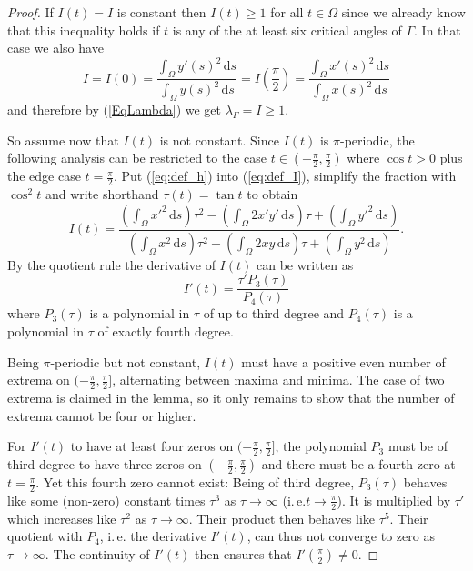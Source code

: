 \documentclass[10pt,a4paper]{amsart}
\newcommand{\ds}{\,\mathrm{d}s}
\newcommand{\ite}{i.\,e.\xspace}
\begin{document}
\begin{proof}
    If $I(t) = I$ is constant then $I(t) \ge 1$ for all $t\in\Omega$ since we already know that this inequality holds if $t$ is any of the at least six critical angles of $\Gamma$. In that case we also have
    \[I = I(0) = \frac{\int_\Omega y'(s)^2\ds}{\int_\Omega y(s)^2\ds} = I(\frac{\pi}{2}) = \frac{\int_\Omega x'(s)^2\ds}{\int_\Omega x(s)^2\ds}\]
    and therefore by (\ref{EqLambda}) we get  $\lambda_\Gamma = I \ge 1$.
    
    So assume now that $I(t)$ is not constant. Since $I(t)$ is $\pi$-periodic, the following analysis can be restricted to the case $t \in (-\frac\pi2,\frac\pi2)$ where $\cos t>0$ plus the edge case $t = \frac\pi2$.
    Put (\ref{eq:def_h}) into (\ref{eq:def_I}), simplify the fraction with $\cos^2 t$ and write shorthand $\tau(t) = \tan t$ to obtain
    \begin{equation*}
         I(t) = \frac{(\int_\Omega x'^2\ds) \tau^2 -(\int_\Omega 2x'y' \ds) \tau +(\int_\Omega y'^2 \ds)}{(\int_\Omega x^2\ds) \tau^2 -(\int_\Omega 2xy \ds) \tau +(\int_\Omega y^2 \ds)}.
    \end{equation*}
    By the quotient rule the derivative of $I(t)$ can be written as
    \[I'(t) = \frac{\tau' P_3(\tau)}{P_4(\tau)}\]
    where $P_3(\tau)$ is a polynomial in $\tau$ of up to third degree and $P_4(\tau)$ is a polynomial in $\tau$ of exactly fourth degree.

    Being $\pi$-periodic but not constant, $I(t)$ must have a positive even number of extrema on $(-\frac\pi 2,\frac\pi 2]$, alternating between maxima and minima.
    The case of two extrema is claimed in the lemma, so it only remains to show that the number of extrema cannot be four or higher.

    For $I'(t)$ to have at least four zeros on $(-\frac\pi 2,\frac\pi 2]$, the polynomial $P_3$ must be of third degree to have three zeros on $(-\frac\pi 2,\frac\pi 2)$ and there must be a fourth zero at $t = \frac\pi 2$. Yet this fourth zero cannot exist: Being of third degree, $P_3(\tau)$ behaves like some (non-zero) constant times $\tau^3$ as $\tau \rightarrow \infty$ (\ite $t \rightarrow \frac\pi 2$). It is multiplied by $\tau'$ which increases like $\tau^2$ as $\tau \rightarrow \infty$. Their product then behaves like $\tau^5$. Their quotient with $P_4$, \ite the derivative $I'(t)$, can thus not converge to zero as $\tau\rightarrow\infty$. The continuity of $I'(t)$ then ensures that $I'(\frac\pi 2) \neq 0$.
\end{proof}
\end{document}
